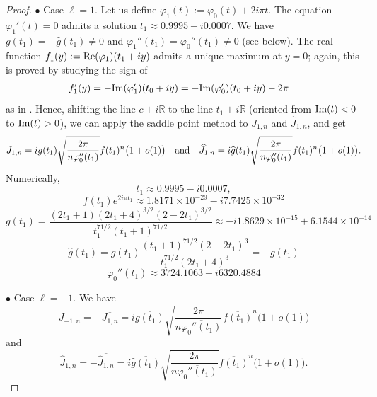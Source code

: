 \documentclass[reqno,12pt]{article}
\theoremstyle{remark}
\begin{document}
\begin{proof}
\noindent $\bullet$ Case $\ell=1$. Let us define  $\varphi_1(t):=\varphi_0(t)+2i\pi t$. The equation $\varphi_1'(t)=0$ admits a solution 
$t_1\approx 0.9995-i0.0007$.
We have $g(t_1)=-\widehat{g}(t_1)\neq 0$ and $\varphi_1''(t_1)=\varphi_0''(t_1)\neq 0$ (see below).
The real function $f_1(y):=\textup{Re}(\varphi_1)(t_1+iy)$ admits a unique maximum at $y=0$; again, this is proved by studying the sign of 
\begin{align*}
f_1'(y)&=-\textup{Im}(\varphi_1')(t_0+iy)=-\textup{Im}(\varphi_0')(t_0+iy)-2\pi
\end{align*}
as in \cite[Lemma 4]{ri2}. Hence, shifting the line $c+i\mathbb R$ to the line $t_1+i\mathbb R$ (oriented from $\textup{Im}(t)<0$ to $\textup{Im}(t)>0$), we can apply the saddle point method to $J_{1,n}$ and $\widehat{J}_{1,n}$, and get
$$
J_{1,n}= ig(t_1) \sqrt{\frac{2\pi}{n\varphi_0''(t_1)} } f(t_1)^n \big(1+o(1)\big)
\quad \textup{and} \quad 
\widehat{J}_{1,n}= i \widehat{g}(t_1) \sqrt{\frac{2\pi}{n\varphi_0''(t_1)} } f(t_1)^n \big(1+o(1)\big).
$$
Numerically,
$$
t_1\approx 0.9995-i0.0007, 
$$
$$f(t_1)e^{2i\pi t_1}\approx 1.8171 \times 10^{-29}-i7.7425 \times 10^{-32}
$$
$$
g(t_1)=\frac{(2t_1+1)(2t_1+4)^{3/2}(2-2t_1)^{3/2}}
{t_1^{71/2}(t_1+1)^{71/2}}\approx -i1.8629 \times 10^{-15}+6.1544 \times 10^{-14}
$$
$$
\widehat{g}(t_1)=g(t_1)\frac{(t_1+1)^{71/2}(2-2t_1)^3}{t_1^{71/2}(2t_1+4)^3}=-g(t_1)
$$
$$\varphi_0''(t_1)\approx 3724.1063-i6320.4884
$$


\noindent $\bullet$ Case $\ell=-1$.  We have 
$$
J_{-1,n}= -\overline{J_{1,n}}=i\overline{g(t_{1})} \sqrt{\frac{2\pi}{n\overline{\varphi_{0}''(t_{1})}} } \overline{f(t_{1})}^n \big(1+o(1)\big)
$$
and 
$$
\widehat{J}_{1,n}=-\overline{\widehat{J}_{1,n}} =i \overline{\widehat{g}(t_{1})} \sqrt{\frac{2\pi}{n\overline{\varphi_{0}''(t_{1})}} } \overline{f(t_{1})}^n \big(1+o(1)\big).
$$



\end{proof}
\end{document}
